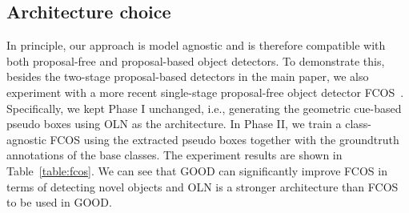 \documentclass{article} \usepackage{iclr2023_conference,times}
\begin{document}
\begin{table}
\centering
{}
    \caption{\textbf{More comparison of GOOD-Both and GOOD-All.} For GOOD-All, the performance gains in detecting small objects (AR$^s$) are too small to compensate for the losses in detecting larger objects (AR$^m$ and (AR$^l$)), leading to overall inferior performance.}\label{table:goodall}
\end{table}

\subsection{Architecture choice}
In principle, our approach is model agnostic and is therefore compatible with both proposal-free and proposal-based object detectors. To demonstrate this, besides the two-stage proposal-based detectors in the main paper, we also experiment with a more recent single-stage proposal-free object detector FCOS~\citep{tian2019fcos}. 
Specifically, we kept Phase I unchanged, i.e., generating the geometric cue-based pseudo boxes using OLN as the architecture. In Phase II, we train a class-agnostic FCOS using the extracted pseudo boxes together with the groundtruth annotations of the base classes.
The experiment results are shown in Table~\ref{table:fcos}. We can see that GOOD can  significantly improve FCOS in terms of detecting novel objects and OLN is a stronger architecture than FCOS to be used in GOOD.
\end{document}
